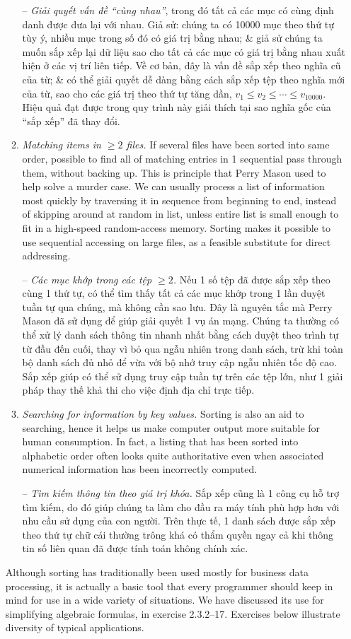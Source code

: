 \documentclass{article}
\begin{document}
\begin{itemize}
\begin{enumerate}
        -- {\it Giải quyết vấn đề ``cùng nhau''}, trong đó tất cả các mục có cùng định danh được đưa lại với nhau. Giả sử: chúng ta có 10000 mục theo thứ tự tùy ý, nhiều mục trong số đó có giá trị bằng nhau; \& giả sử chúng ta muốn sắp xếp lại dữ liệu sao cho tất cả các mục có giá trị bằng nhau xuất hiện ở các vị trí liên tiếp. Về cơ bản, đây là vấn đề sắp xếp theo nghĩa cũ của từ; \& có thể giải quyết dễ dàng bằng cách sắp xếp tệp theo nghĩa mới của từ, sao cho các giá trị theo thứ tự tăng dần, $v_1\le v_2\le\cdots\le v_{10000}$. Hiệu quả đạt được trong quy trình này giải thích tại sao nghĩa gốc của ``sắp xếp'' đã thay đổi.
        \item {\it Matching items in $\ge2$ files.} If several files have been sorted into same order, possible to find all of matching entries in 1 sequential pass through them, without backing up. This is principle that {\sc Perry Mason} used to help solve a murder case. We can usually process a list of information most quickly by traversing it in sequence from beginning to end, instead of skipping around at random in list, unless entire list is small enough to fit in a high-speed random-access memory. Sorting makes it possible to use sequential accessing on large files, as a feasible substitute for direct addressing.
        
        -- {\it Các mục khớp trong các tệp $\ge2$.} Nếu 1 số tệp đã được sắp xếp theo cùng 1 thứ tự, có thể tìm thấy tất cả các mục khớp trong 1 lần duyệt tuần tự qua chúng, mà không cần sao lưu. Đây là nguyên tắc mà {\sc Perry Mason} đã sử dụng để giúp giải quyết 1 vụ án mạng. Chúng ta thường có thể xử lý danh sách thông tin nhanh nhất bằng cách duyệt theo trình tự từ đầu đến cuối, thay vì bỏ qua ngẫu nhiên trong danh sách, trừ khi toàn bộ danh sách đủ nhỏ để vừa với bộ nhớ truy cập ngẫu nhiên tốc độ cao. Sắp xếp giúp có thể sử dụng truy cập tuần tự trên các tệp lớn, như 1 giải pháp thay thế khả thi cho việc định địa chỉ trực tiếp.
        \item {\it Searching for information by key values.} Sorting is also an aid to searching, hence it helps us make computer output more suitable for human consumption. In fact, a listing that has been sorted into alphabetic order often looks quite authoritative even when associated numerical information has been incorrectly computed.
        
        -- {\it Tìm kiếm thông tin theo giá trị khóa.} Sắp xếp cũng là 1 công cụ hỗ trợ tìm kiếm, do đó giúp chúng ta làm cho đầu ra máy tính phù hợp hơn với nhu cầu sử dụng của con người. Trên thực tế, 1 danh sách được sắp xếp theo thứ tự chữ cái thường trông khá có thẩm quyền ngay cả khi thông tin số liên quan đã được tính toán không chính xác.
    \end{enumerate}
    Although sorting has traditionally been used mostly for business data processing, it is actually a basic tool that every programmer should keep in mind for use in a wide variety of situations. We have discussed its use for simplifying algebraic formulas, in exercise 2.3.2--17. Exercises below illustrate diversity of typical applications.
    

\end{itemize}
\end{document}
